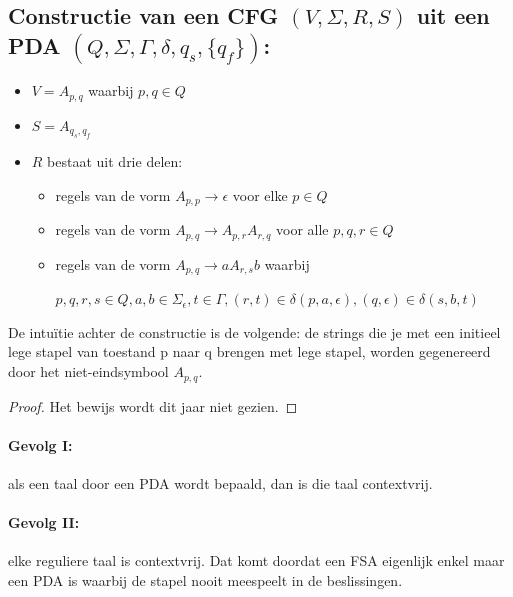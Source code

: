 \subsection{Constructie van een CFG $(V,\Sigma,R,S)$ uit een PDA
$(Q,\Sigma,\Gamma,\delta,q_s,\{q_f\})$:}
\begin{itemize}
\item $V = A_{p,q}$ waarbij $p, q \in Q$
\item $S = A_{q_s,q_f}$
\item $R$ bestaat uit drie delen:
\begin{itemize}
\item regels van de vorm $A_{p,p} \rightarrow \epsilon$ voor elke $p \in Q$
\item regels van de vorm $A_{p,q} \rightarrow A_{p,r}A_{r,q}$ voor
alle $p, q, r \in Q$
\item regels van de vorm $A_{p,q} \rightarrow aA_{r,s}b$ waarbij

$p, q, r, s \in Q, 
a,b \in \Sigma_\epsilon, 
t \in \Gamma,
(r,t) \in \delta(p,a,\epsilon),
(q,\epsilon) \in \delta(s,b,t)$
\end{itemize}

\end{itemize}


De intu\"{i}tie achter de constructie is de volgende: de strings die je
met een initieel lege stapel van toestand p naar q brengen met lege
stapel, worden gegenereerd door het niet-eindsymbool $A_{p,q}$.

\begin{proof}
Het bewijs wordt dit jaar niet gezien.
\end{proof}


\paragraph{Gevolg I:} als een taal door een PDA wordt bepaald, dan is
die taal contextvrij.

\paragraph{Gevolg II:} elke reguliere taal is contextvrij. Dat komt
doordat een FSA eigenlijk enkel maar een PDA is waarbij de stapel
nooit meespeelt in de beslissingen.

